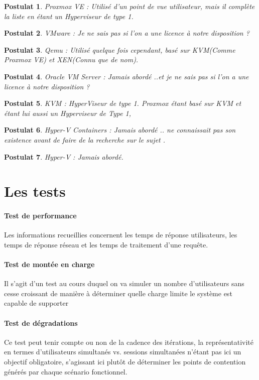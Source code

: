 \documentclass[french]{article}
\newtheorem{post}{Postulat}
\begin{document}
\begin{post}
Proxmox VE : Utilisé d'un point de vue utilisateur, mais il complète la liste en étant un Hyperviseur de type 1.
\end{post}

\begin{post}
VMware : Je ne sais pas si l'on a une licence à notre disposition ? 
\end{post}

\begin{post}
Qemu : Utilisé quelque fois cependant, basé sur KVM(Comme Proxmox VE) et XEN(Connu que de nom). 
\end{post}


\begin{post}
Oracle VM Server : Jamais abordé ..et je ne sais pas si l'on a une licence à notre disposition ? 
\end{post}

\begin{post}
KVM : HyperViseur de type 1. Proxmox étant basé sur KVM et étant lui aussi un Hyperviseur de Type 1, 
\end{post}

\begin{post}
Hyper-V Containers : Jamais abordé .. ne connaissait pas son existence avant de faire de la recherche sur le sujet .
\end{post}

\begin{post}
Hyper-V : Jamais abordé.
\end{post}

\newpage
\section{Les tests}
\paragraph{Test de performance}
 Les informations recueillies concernent les temps de réponse utilisateurs, les temps de réponse réseau et les temps de traitement d’une requête.
\paragraph{Test de montée en charge}
Il s'agit d'un test au cours duquel on va simuler un nombre d'utilisateurs sans cesse croissant de manière à déterminer quelle charge limite le système est capable de supporter
\paragraph{Test de dégradations}
 Ce test peut tenir compte ou non de la cadence des itérations, la représentativité en termes d'utilisateurs simultanés vs. sessions simultanées n'étant pas ici un objectif obligatoire, s'agissant ici plutôt de déterminer les points de contention générés par chaque scénario fonctionnel.
\end{document}
